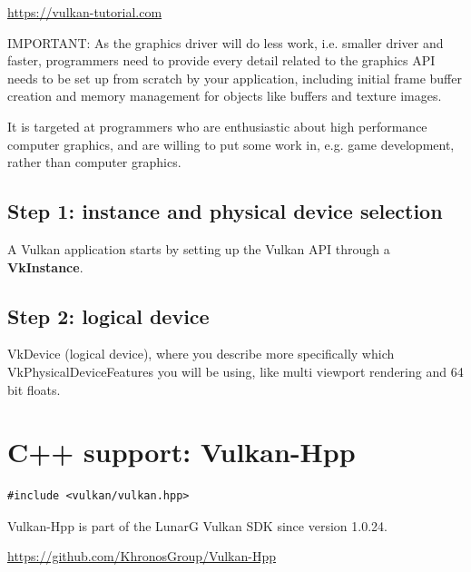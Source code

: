 \url{https://vulkan-tutorial.com}

IMPORTANT: As the graphics driver will do less work, i.e. smaller driver and
faster, programmers need to provide every detail related to the graphics API
needs to be set up from scratch by your application, including initial frame
buffer creation and memory management for objects like buffers and texture
images.

It is targeted at programmers who are enthusiastic about high performance
computer graphics, and are willing to put some work in, e.g. game development,
rather than computer graphics.

\subsection{Step 1: instance and physical device selection}

A Vulkan application starts by setting up the Vulkan API through a {\bf VkInstance}.

\subsection{Step 2: logical device}

VkDevice (logical device), where you describe more specifically which
VkPhysicalDeviceFeatures you will be using, like multi viewport rendering and 64
bit floats.

 
 



\section{C++ support: Vulkan-Hpp}

\begin{lstlisting}
#include <vulkan/vulkan.hpp>
\end{lstlisting}

Vulkan-Hpp is part of the LunarG Vulkan SDK since version 1.0.24.

\url{https://github.com/KhronosGroup/Vulkan-Hpp}